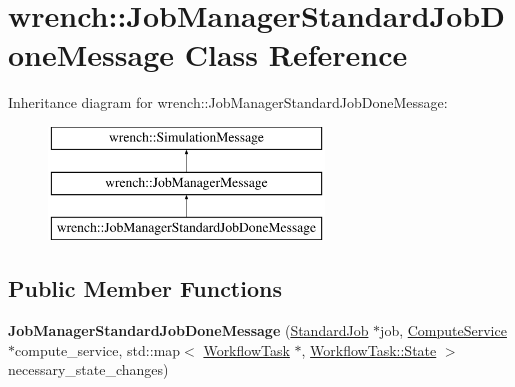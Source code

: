\hypertarget{classwrench_1_1_job_manager_standard_job_done_message}{}\section{wrench\+:\+:Job\+Manager\+Standard\+Job\+Done\+Message Class Reference}
\label{classwrench_1_1_job_manager_standard_job_done_message}
Inheritance diagram for wrench\+:\+:Job\+Manager\+Standard\+Job\+Done\+Message\+:\begin{figure}[H]
\begin{center}
\leavevmode
\includegraphics[height=3.000000cm]{classwrench_1_1_job_manager_standard_job_done_message}
\end{center}
\end{figure}
\subsection*{Public Member Functions}
\begin{DoxyCompactItemize}
\item 
\mbox{\label{classwrench_1_1_job_manager_standard_job_done_message_ad0bf001974cd6b823fad99d194e9b50c}} 
{\bfseries Job\+Manager\+Standard\+Job\+Done\+Message} (\hyperlink{classwrench_1_1_standard_job}{Standard\+Job} $\ast$job, \hyperlink{classwrench_1_1_compute_service}{Compute\+Service} $\ast$compute\+\_\+service, std\+::map$<$ \hyperlink{classwrench_1_1_workflow_task}{Workflow\+Task} $\ast$, \hyperlink{classwrench_1_1_workflow_task_a1184f3d7aea21e1c87a9b17e84f1f92a}{Workflow\+Task\+::\+State} $>$ necessary\+\_\+state\+\_\+changes)
\end{DoxyCompactItemize}
